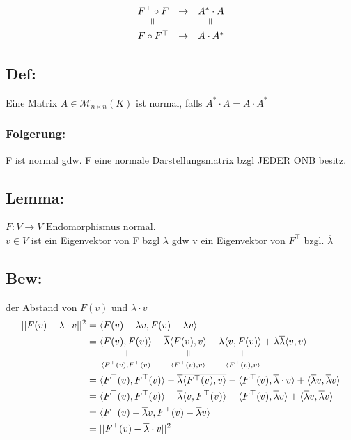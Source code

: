\documentclass[titlepage,12pt,a4paper,ngerman]{report}
\newcommand{\verteq}{\rotatebox{90}{$\,=$}}
\newcommand{\equalto}[2]{\underset{\scriptstyle\overset{\mkern4mu\verteq}{#2}}{#1}}
\newcommand{\enph}{F: V \to V \textrm{ Endomorphismus}}
\begin{document}
$$\begin{array}{ccc}
F^\top \circ F & \to & A^* \cdot A \\ \rotatebox{90}{$\,=$}& & \rotatebox{90}{$\,=$}\\ F \circ F^\top & \to & A \cdot A^* 
\end{array}$$

\subsection{Def:}
Eine Matrix $A \in \mathcal M_{n \times n} (K)$ ist normal, falls $A^* \cdot A = A \cdot A^*$

\subsubsection{Folgerung:}
F ist normal gdw. F eine normale Darstellungsmatrix bzgl JEDER ONB \underline{besitz}.
\subsection{Lemma:}
$ \enph $ normal.\\
$ v \in V $ ist ein Eigenvektor von F bzgl $ \lambda $ gdw v ein Eigenvektor von $ F^\top $ bzgl. $ \overline{\lambda} $
\subsection{Bew:}
der Abstand von $ F(v) $ und $ \lambda \cdot v $
\begin{align*}
 || F(v) - \lambda \cdot v ||^2  &= \langle  F(v) - \lambda v, F(v) - \lambda v \rangle\\
 &= \equalto{\langle F(v), F(v) \rangle }{\langle F^\top(v) , F^\top(v)}  - \overline{\lambda} \equalto{\langle F(v) , v \rangle}{\langle F^\top(v),v \rangle} - \lambda \equalto{\langle v, F(v) \rangle}{\langle F^\top(v),v \rangle} + \lambda \overline{\lambda} \langle v, v \rangle\\
 &= \langle F^\top(v) , F^\top(v) \rangle - \overline{\lambda} \overline{\langle F^\top(v) , v \rangle} - \langle F^\top(v) , \overline{\lambda} \cdot v \rangle + \langle \overline{\lambda} v , \overline{\lambda} v \rangle\\
 &= \langle F^\top(v), F^\top(v) \rangle - \overline{\lambda} \langle v, F^\top(v) \rangle - \langle F^\top(v) , \overline{\lambda}v\rangle + \langle \overline{\lambda} v , \overline{\lambda} v \rangle\\
 &= \langle F^\top(v) - \overline{\lambda}v , F^\top(v) - \overline{\lambda} v \rangle \\
 &= || F^\top(v) - \overline{\lambda} \cdot v ||^2 
\end{align*}
\end{document}
